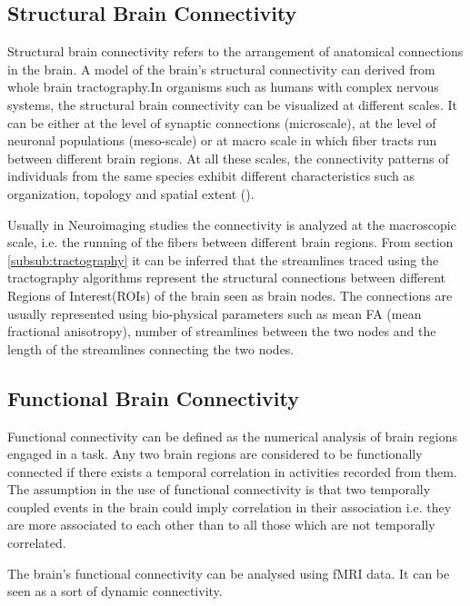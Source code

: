 \documentclass[msthesis.tex]{subfiles}
\begin{document}
\subsection{Structural Brain Connectivity}
Structural brain connectivity refers to the arrangement of anatomical connections in the brain. A model of the brain's structural connectivity can derived from whole brain tractography.In organisms such as humans with complex nervous systems, the structural brain connectivity can be visualized at different scales. It can be either at the level of synaptic connections (microscale), at the level of neuronal populations (meso-scale) or at macro scale in which fiber tracts run between different brain regions. At all these scales, the connectivity patterns of individuals from the same species exhibit different characteristics such as organization, topology and spatial extent (\cite{Sporns:2007}).

Usually in Neuroimaging studies the connectivity is analyzed at the macroscopic scale, i.e. the running of the fibers between different brain regions.  From section \ref{subsub:tractography} it can be inferred that the streamlines traced using the tractography algorithms represent the structural connections between different Regions of Interest(ROIs) of the brain seen as brain nodes. The connections are usually represented using bio-physical parameters such as mean FA (mean fractional anisotropy), number of streamlines between the two nodes and the length of the streamlines connecting the two nodes.

\subsection{Functional Brain Connectivity}

Functional connectivity can be defined as the numerical analysis of brain regions engaged in a task. Any two brain regions are considered to be functionally connected if there exists a temporal correlation in activities recorded from them. The assumption in the use of functional connectivity is that two temporally coupled events in the brain could imply correlation in their association i.e. they are more associated to each other than to all those which are not temporally correlated.

The brain's functional connectivity can be analysed using fMRI data. It can be seen as a sort of dynamic connectivity. 
\end{document}
